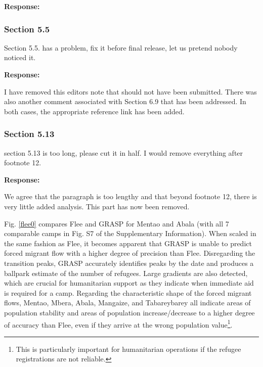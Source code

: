 \documentclass[11pt,a4paper]{article}
\begin{document}
\textbf{Response:}


\vspace{0.5cm}

\subsubsection*{Section 5.5}

\begin{reviewbox}
Section 5.5. has a problem, fix it before final release, let us pretend nobody noticed it.
\end{reviewbox}

\textbf{Response:}

I have removed this editors note that should not have been submitted. There was also another
comment associated with Section 6.9 that has been addressed. In both cases, the appropriate
reference link has been added.

\vspace{0.5cm}

\subsubsection*{Section 5.13}

\begin{reviewbox}
section 5.13 is too long, please cut it in half. I would remove everything after footnote 12.
\end{reviewbox}

\textbf{Response:}

We agree that the paragraph is too lengthy and that beyond footnote 12, there is very little
 added analysis. This part has now been removed.

\vspace{0.5cm}

\begin{updatebox}
Fig. \ref{flee0} compares Flee and GRASP for Mentao and Abala (with all 7 comparable camps in Fig. S7 of the 
Supplementary Information). When scaled in the same fashion as Flee, it becomes apparent that GRASP is unable to predict 
forced migrant flow with a higher degree of precision than Flee. Disregarding the transition peaks, GRASP accurately 
identifies peaks by the date and produces a ballpark estimate of the number of refugees. Large gradients are also 
detected, which are crucial for humanitarian support as they indicate when immediate aid is required for a camp. 
Regarding the characteristic shape of the forced migrant flows, Mentao, Mbera, Abala, Mangaize, and Tabareybarey all 
indicate areas of population stability and areas of population increase/decrease to a higher degree of accuracy than 
Flee, even if they arrive at the wrong population value\footnote{This is particularly important for humanitarian 
operations if the refugee registrations are not reliable.}. 
\end{updatebox}
\end{document}
